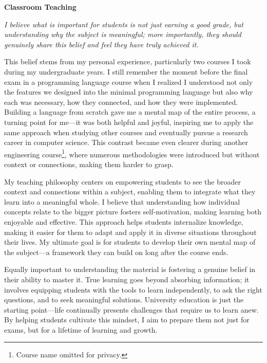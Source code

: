 \documentclass{article}
\begin{document}
\vspace{.5em}\noindent\textbf{Classroom Teaching}\vspace{.5em}

\noindent \emph{I believe what is important for students is not just earning a good grade, but understanding why the subject is meaningful; more importantly, they should genuinely share this belief and feel they have truly achieved it.} 

This belief stems from my personal experience, particularly two courses I took during my undergraduate years. I still remember the moment before the final exam in a programming language course when I realized I understood not only the features we designed into the minimal programming language but also why each was necessary, how they connected, and how they were implemented. Building a language from scratch gave me a mental map of the entire process, a turning point for me—it was both helpful and joyful, inspiring me to apply the same approach when studying other courses and eventually pursue a research career in computer science. This contrast became even clearer during another engineering course\footnote{Course name omitted for privacy.}, where numerous methodologies were introduced but without context or connections, making them harder to grasp.

My teaching philosophy centers on empowering students to see the broader context and connections within a subject, enabling them to integrate what they learn into a meaningful whole. I believe that understanding how individual concepts relate to the bigger picture fosters self-motivation, making learning both enjoyable and effective. This approach helps students internalize knowledge, making it easier for them to adapt and apply it in diverse situations throughout their lives. My ultimate goal is for students to develop their own mental map of the subject—a framework they can build on long after the course ends.

Equally important to understanding the material is fostering a genuine belief in their ability to master it. True learning goes beyond absorbing information; it involves equipping students with the tools to learn independently, to ask the right questions, and to seek meaningful solutions. University education is just the starting point—life continually presents challenges that require us to learn anew. By helping students cultivate this mindset, I aim to prepare them not just for exams, but for a lifetime of learning and growth.
\end{document}
